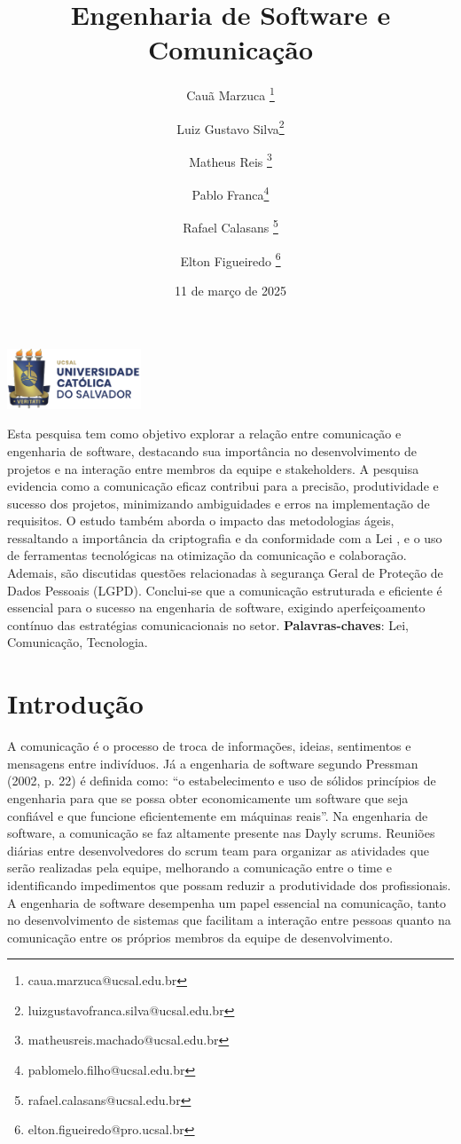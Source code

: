 \documentclass[12pt,oneside,a4paper,article]{abntex2}
\title{\textbf{Engenharia de Software e Comunicação}}
\author{Cauã Marzuca \thanks{caua.marzuca@ucsal.edu.br}}
\author{Luiz Gustavo Silva\thanks{luizgustavofranca.silva@ucsal.edu.br}}
\author[1]{Matheus Reis \thanks{matheusreis.machado@ucsal.edu.br}}
\author[1]{Pablo Franca\thanks{pablomelo.filho@ucsal.edu.br}}
\author[1]{Rafael Calasans \thanks{rafael.calasans@ucsal.edu.br} }
\author[1*]{Elton Figueiredo \thanks{elton.figueiredo@pro.ucsal.br}}
\affil{
  Engenharia de Software \par
  Escola de Tecnologias \par
Universidade Católica do Salvador (UCSAL) \par
Av. Prof. Pinto de Aguiar, 2589 Pituaçu, CEP: 41740-090 \par
Salvador/BA, Brasil
}
\affil[1*]{\textit {elton.figueiredo@pro.ucsal.br}}
\date{11 de março de 2025}
\begin{document}
\begin{center}
    \includegraphics[width=0.3\textwidth]{imagens-template/ucsal_logo.png} 
\end{center}
{\let\newpage\relax\maketitle}

\begin{resumoumacoluna}
 
 \vspace{\onelineskip}
 Esta pesquisa tem como objetivo explorar a relação entre comunicação e engenharia de software, destacando sua importância no desenvolvimento de projetos e na interação entre membros da equipe e stakeholders. A pesquisa evidencia como a comunicação eficaz contribui para a precisão, produtividade e sucesso dos projetos, minimizando ambiguidades e erros na implementação de requisitos. O estudo também aborda o impacto das metodologias ágeis, ressaltando a importância da criptografia e da conformidade com a Lei , e o uso de ferramentas tecnológicas na otimização da comunicação e colaboração. Ademais, são discutidas questões relacionadas à segurança Geral de Proteção de Dados Pessoais (LGPD). Conclui-se que a comunicação estruturada e eficiente é essencial para o sucesso na engenharia de software, exigindo aperfeiçoamento contínuo das estratégias comunicacionais no setor.
 \noindent
 \textbf{Palavras-chaves}: Lei, Comunicação, Tecnologia.
\end{resumoumacoluna}

\textual

\section{Introdução}
A comunicação é o processo de troca de informações, ideias, sentimentos e mensagens entre indivíduos. Já a engenharia de software segundo Pressman (2002, p. 22) é definida como: “o estabelecimento e uso de sólidos princípios de engenharia para que se possa obter economicamente um software que seja confiável e que funcione eficientemente em máquinas reais”.
 Na engenharia de software, a comunicação se faz altamente presente nas Dayly scrums.
Reuniões diárias entre desenvolvedores do scrum team para organizar as atividades que serão realizadas pela equipe, melhorando a comunicação entre o time e identificando impedimentos que possam reduzir a produtividade dos profissionais. 
A engenharia de software desempenha um papel essencial na comunicação, tanto no desenvolvimento de sistemas que facilitam a interação entre pessoas quanto na comunicação entre os próprios membros da equipe de desenvolvimento.
\end{document}
